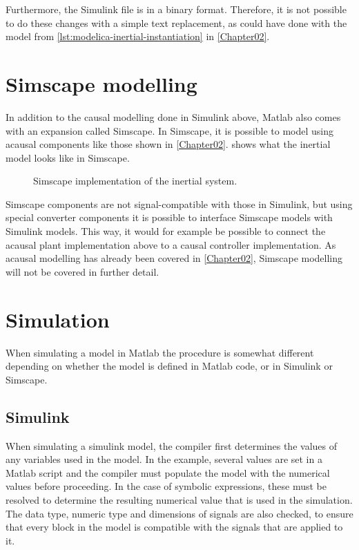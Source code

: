 \documentclass[\rootfolder/main.tex]{subfiles}
\begin{document}
Furthermore, the Simulink file is in a binary format.
Therefore, it is not possible to do these changes with a simple text replacement, as could have done with the model from \cref{lst:modelica-inertial-instantiation} in \cref{Chapter02}.

\section{Simscape modelling}

In addition to the causal modelling done in Simulink above, Matlab also comes with an expansion called Simscape.
In Simscape, it is possible to model using acausal components like those shown in \cref{Chapter02}.
 shows what the inertial model looks like in Simscape.

\begin{figure}[ht]
    \caption{Simscape implementation of the inertial system.\label{fig:simscape-inertial}}
\end{figure}

Simscape components are not signal-compatible with those in Simulink, but using special converter components it is possible to interface Simscape models with Simulink models.
This way, it would for example be possible to connect the acausal plant implementation above to a causal controller implementation.
As acausal modelling has already been covered in \cref{Chapter02}, Simscape modelling will not be covered in further detail.

\section{Simulation}

When simulating a model in Matlab the procedure is somewhat different depending on whether the model is defined in Matlab code, or in Simulink or Simscape.

\subsection{Simulink}

When simulating a simulink model, the compiler first determines the values of any variables used in the model.
In the example, several values are set in a Matlab script and the compiler must populate the model with the numerical values before proceeding.
In the case of symbolic expressions, these must be resolved to determine the resulting numerical value that is used in the simulation.
The data type, numeric type and dimensions of signals are also checked, to ensure that every block in the model is compatible with the signals that are applied to it.
\end{document}
